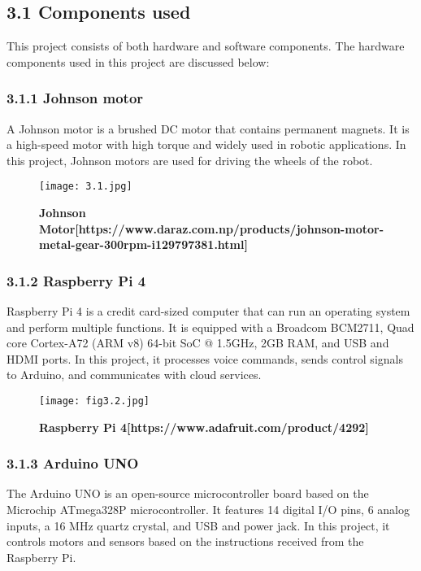 \subsection*{3.1 Components used}

This project consists of both hardware and software components. The hardware components used in this project are discussed below:

\subsubsection*{3.1.1 Johnson motor}

A Johnson motor is a brushed DC motor that contains permanent magnets. It is a high-speed motor with high torque and widely used in robotic applications. In this project, Johnson motors are used for driving the wheels of the robot.

\begin{figure}[H]
    \centering
    \texttt{[image: 3.1.jpg]}
    \caption{\textbf{Johnson Motor[https://www.daraz.com.np/products/johnson-motor-metal-gear-300rpm-i129797381.html]}}
    \label{fig:3.1}
\end{figure}

\subsubsection*{3.1.2 Raspberry Pi 4}

Raspberry Pi 4 is a credit card-sized computer that can run an operating system and perform multiple functions. It is equipped with a Broadcom BCM2711, Quad core Cortex-A72 (ARM v8) 64-bit SoC @ 1.5GHz, 2GB RAM, and USB and HDMI ports. In this project, it processes voice commands, sends control signals to Arduino, and communicates with cloud services.

\begin{figure}[H]
    \centering
    \texttt{[image: fig3.2.jpg]}
    \caption{\textbf{Raspberry Pi 4[https://www.adafruit.com/product/4292]}}
    \label{fig:3.2}
\end{figure}

\subsubsection*{3.1.3 Arduino UNO}

The Arduino UNO is an open-source microcontroller board based on the Microchip ATmega328P microcontroller. It features 14 digital I/O pins, 6 analog inputs, a 16 MHz quartz crystal, and USB and power jack. In this project, it controls motors and sensors based on the instructions received from the Raspberry Pi.

